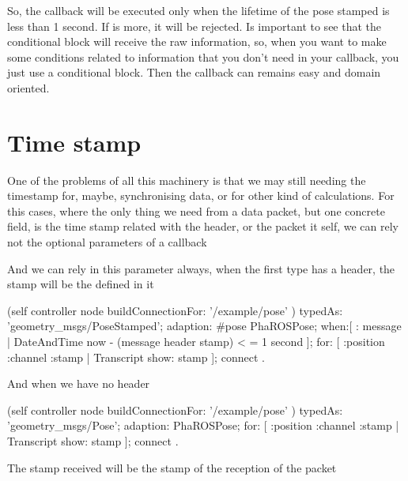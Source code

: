 \documentclass[a4paper,10pt,twoside]{book}
\begin{document}
{\begin{code}
							\end{code}
							
							
							
							So, the callback will be executed only when the lifetime of the pose stamped is less than 1 second. If is more, it will be rejected.
							Is important to see that the conditional block will receive the raw information, so, when you want to make some conditions related to information that you don't need in your callback, you just use a conditional block. Then the callback can remains easy and domain oriented. 
							
							
					
					\section {Time stamp}
					
						One of the problems of all this machinery is that we may still needing the timestamp for, maybe, synchronising data, or for other kind of calculations. 
						For this cases, where the only thing we need from a data packet, but one concrete field, is the time stamp related with the header, or the packet it self, we can rely not the optional parameters of a callback
						
						And we can rely in this parameter always, when the first type has a header, the stamp will be the defined in it
						
						\begin{code}
				(self controller node buildConnectionFor: '/example/pose' ) 
					typedAs: 'geometry_msgs/PoseStamped'; 
					adaption: #pose \> PhaROSPose;
					when:[ : message | DateAndTime now - (message header stamp) < = 1 second ];
					for: [ :position :channel :stamp |  Transcript show: stamp  ];
					connect .
					
						\end{code}
					
					And when we have no header
					
						\begin{code}
				(self controller node buildConnectionFor: '/example/pose' ) 
					typedAs: 'geometry_msgs/Pose'; 
					adaption: PhaROSPose;
					for: [ :position :channel :stamp |  Transcript show: stamp  ];
					connect .
					
						\end{code}

					The stamp received will be the stamp of the reception of the packet
					
}
\end{document}

